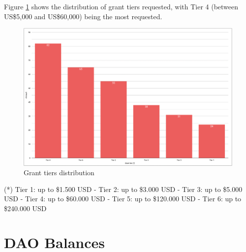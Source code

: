 \documentclass[MSE,Master,english]{twbook}%
\begin{document}
Figure \ref{fig:tier_distribution} shows the distribution of grant tiers requested, with Tier 4 (between US\$5,000 and US\$60,000) being the most requested.
\begin{figure}[H]
  \centering
  \includegraphics[width=\textwidth]{metrics/tier_distribution.png}
  \caption{Grant tiers distribution}
  \label{fig:tier_distribution}
\end{figure}
(*) Tier 1: up to \$1.500 USD - Tier 2: up to \$3.000 USD - Tier 3: up to \$5.000 USD - Tier 4: up to \$60.000 USD - Tier 5: up to \$120.000 USD - Tier 6: up to \$240.000 USD

\section{DAO Balances}
\end{document}
